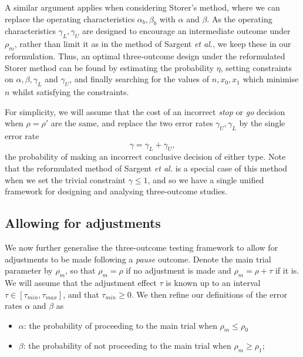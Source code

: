 \documentclass{bmcart}
\begin{document}
A similar argument applies when considering Storer's method, where we can replace the operating characteristics $\alpha_b, \beta_b$ with $\alpha$ and $\beta$. As the operating characteristics $\gamma_L, \gamma_U$ are designed to encourage an intermediate outcome under $\rho_m$, rather than limit it as in the method of Sargent \emph{et al.}, we keep these in our reformulation. Thus, an optimal three-outcome design under the reformulated Storer method can be found by estimating the probability $\eta$, setting constraints on $\alpha, \beta, \gamma_L$ and $\gamma_U$, and finally searching for the values of  $n, x_0, x_1$ which minimise $n$ whilst satisfying the constraints. 

For simplicity, we will assume that the cost of an incorrect \emph{stop} or \emph{go} decision when $\rho = \rho'$ are the same, and replace the two error rates $\gamma_U, \gamma_L$ by the single error rate
$$
\gamma = \gamma_L + \gamma_U,
$$
the probability of making an incorrect conclusive decision of either type. Note that the reformulated method of Sargent \emph{et al.} is a special case of this method when we set the trivial constraint $\gamma \leq 1$, and so we have a single unified framework for designing and analysing three-outcome studies.

\subsection{Allowing for adjustments}\label{sec:adjustments}


We now further generalise the three-outcome testing framework to allow for adjustments to be made following a \emph{pause} outcome. Denote the main trial parameter by $\rho_m$, so that $\rho_m = \rho$ if no adjustment is made and $\rho_m  = \rho + \tau$ if it is. We will assume that the adjustment effect $\tau$ is known up to an interval $\tau \in [\tau_{min}, \tau_{max}]$, and that $\tau_{min} \geq 0$. We then refine our definitions of the error rates $\alpha$ and $\beta$ as

\begin{itemize}
\item $\alpha$: the probability of proceeding to the main trial when $\rho_m \leq \rho_0$
\item $\beta$: the probability of not proceeding to the main trial when $\rho_m \geq \rho_1$;
\end{itemize}
\end{document}
